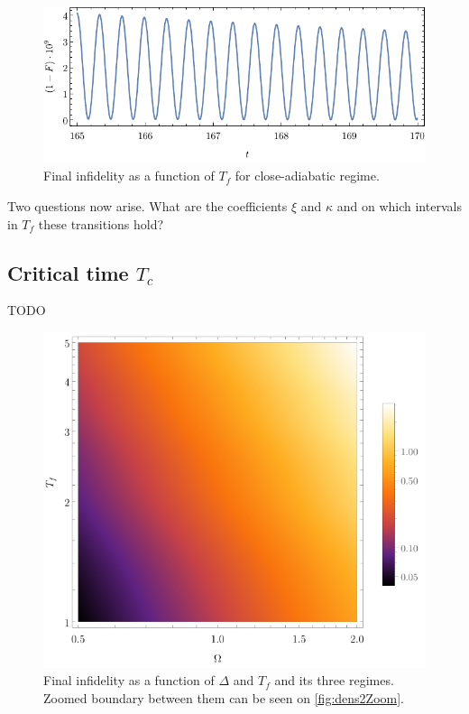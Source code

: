 \begin{figure}[H]
    \centering
    \includegraphics[scale=1.2]{../img/abovecritical.pdf}
    \caption{Final infidelity as a function of $T_f$ for close-adiabatic regime.}
    \label{fig:overcritical}
\end{figure}

Two questions now arise. What are the coefficients $\xi$ and $\kappa$ and on which intervals in $T_f$ these transitions hold? 

\subsection{Critical time $T_c$}
TODO

\begin{figure}[H]
    \centering 
    \includegraphics[scale=1.2]{../img/dens2.pdf}
    \caption{Final infidelity as a function of $\Delta$ and $T_f$ and its three regimes. Zoomed boundary between them can be seen on \ref{fig:dens2Zoom}.}
    \label{fig:dens2}
\end{figure}

